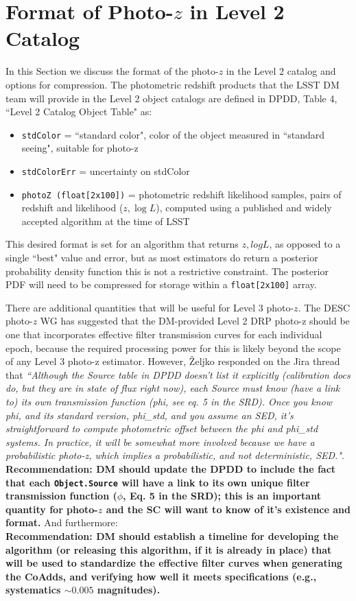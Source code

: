 \documentclass[DM,lsstdraft,toc]{lsstdoc}
\begin{document}
\section{Format of Photo-$z$ in Level 2 Catalog}\label{sec:format}

In this Section we discuss the format of the photo-$z$ in the Level 2 catalog and options for compression. The photometric redshift products that the LSST DM team will provide in the Level 2 object catalogs are defined in DPDD, Table 4, ``Level 2 Catalog Object Table" as:
\begin{itemize}
\item {\tt stdColor} = ``standard color", color of the object measured in ``standard seeing", suitable for photo-z
\item {\tt stdColorErr} = uncertainty on stdColor
\item {\tt photoZ (float[2x100])} = photometric redshift likelihood samples, pairs of redshift and likelihood ($z,\log{L}$), computed using a published and widely accepted algorithm at the time of LSST
\end{itemize}

\noindent This desired format is set for an algorithm that returns $z,logL$, as opposed to a single ``best" value and error, but as most estimators do return a posterior probability density function this is not a restrictive constraint. The posterior PDF will need to be compressed for storage within a {\tt float[2x100]} array.

There are additional quantities that will be useful for Level 3 photo-$z$. The DESC photo-$z$ WG has suggested that the DM-provided Level 2 DRP photo-z should be one that incorporates effective filter transmission curves for each individual epoch, because the required processing power for this is likely beyond the scope of any Level 3 photo-z estimator. However, \v{Z}eljko responded on the Jira thread that {\it ``Although the Source table in DPDD doesn't list it explicitly (calibration docs do, but they are in state of flux right now), each Source must know (have a link to) its own transmission function (phi, see eq. 5 in the SRD). Once you know phi, and its standard version, phi\_std, and you assume an SED, it's straightforward to compute photometric offset between the phi and phi\_std systems. In practice, it will be somewhat more involved because we have a probabilistic photo-z, which implies a probabilistic, and not deterministic, SED."}. \\
\textbf{Recommendation:  DM should update the DPDD to include the fact that each {\tt Object.Source} will have a link to its own unique filter transmission function ($\phi$, Eq. 5 in the SRD); this is an important quantity for photo-$z$ and the SC will want to know of it's existence and format.}
And furthermore: \\
\textbf{Recommendation: DM should establish a timeline for developing the algorithm (or releasing this algorithm, if it is already in place) that will be used to standardize the effective filter curves when generating the CoAdds, and verifying how well it meets specifications (e.g., systematics $\sim 0.005$ magnitudes).}
\end{document}

